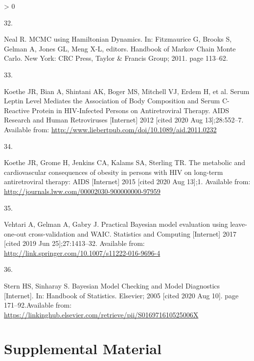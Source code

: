 \documentclass[
]{article}
\newlength{\cslhangindent}
\newlength{\csllabelwidth}
\newenvironment{CSLReferences}[2] %
 {%
  \setlength{\parindent}{0pt}
  \ifodd #1 \everypar{\setlength{\hangindent}{\cslhangindent}}\ignorespaces\fi
  \ifnum #2 > 0
  \setlength{\parskip}{#2\baselineskip}
  \fi
 }%
 {}
\newcommand{\CSLLeftMargin}[1]{\parbox[t]{\csllabelwidth}{#1}}
\newcommand{\CSLRightInline}[1]{\parbox[t]{\linewidth - \csllabelwidth}{#1}\break}
\begin{document}
\begin{CSLReferences}{0}{0}
\leavevmode\hypertarget{ref-neal_mcmc_2011}{}%
\CSLLeftMargin{32. }
\CSLRightInline{Neal R. {MCMC} using {Hamiltonian} {Dynamics}. In: Fitzmaurice G, Brooks S, Gelman A, Jones GL, Meng X-L, editors. Handbook of {Markov} {Chain} {Monte} {Carlo}. New York: CRC Press, Taylor \& Francis Group; 2011. page 113--62.}

\leavevmode\hypertarget{ref-koethe_serum_2012}{}%
\CSLLeftMargin{33. }
\CSLRightInline{Koethe JR, Bian A, Shintani AK, Boger MS, Mitchell VJ, Erdem H, et al. Serum {Leptin} {Level} {Mediates} the {Association} of {Body} {Composition} and {Serum} {C}-{Reactive} {Protein} in {HIV}-{Infected} {Persons} on {Antiretroviral} {Therapy}. AIDS Research and Human Retroviruses {[}Internet{]} 2012 {[}cited 2020 Aug 13{]};28:552--7. Available from: \url{http://www.liebertpub.com/doi/10.1089/aid.2011.0232}}

\leavevmode\hypertarget{ref-koethe_metabolic_2015}{}%
\CSLLeftMargin{34. }
\CSLRightInline{Koethe JR, Grome H, Jenkins CA, Kalams SA, Sterling TR. The metabolic and cardiovascular consequences of obesity in persons with {HIV} on long-term antiretroviral therapy: AIDS {[}Internet{]} 2015 {[}cited 2020 Aug 13{]};1. Available from: \url{http://journals.lww.com/00002030-900000000-97959}}

\leavevmode\hypertarget{ref-vehtari_practical_2017}{}%
\CSLLeftMargin{35. }
\CSLRightInline{Vehtari A, Gelman A, Gabry J. Practical {Bayesian} model evaluation using leave-one-out cross-validation and {WAIC}. Statistics and Computing {[}Internet{]} 2017 {[}cited 2019 Jun 25{]};27:1413--32. Available from: \url{http://link.springer.com/10.1007/s11222-016-9696-4}}

\leavevmode\hypertarget{ref-stern_bayesian_2005}{}%
\CSLLeftMargin{36. }
\CSLRightInline{Stern HS, Sinharay S. Bayesian {Model} {Checking} and {Model} {Diagnostics} {[}Internet{]}. In: Handbook of {Statistics}. Elsevier; 2005 {[}cited 2020 Aug 10{]}. page 171--92.Available from: \url{https://linkinghub.elsevier.com/retrieve/pii/S016971610525006X}}

\end{CSLReferences}

\newpage

\hypertarget{supplemental-material}{%
\section*{Supplemental Material}\label{supplemental-material}}
\end{document}
